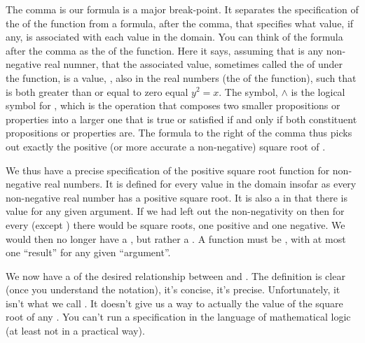 \documentclass[letterpaper,10pt,english]{sphinxmanual}
\begin{document}
The comma is our formula is a major break-point. It separates the
specification of the  of the function from a formula, after
the comma, that specifies what value, if any, is associated with each
value in the domain.  You can think of the formula after the comma as
the  of the function. Here it says, assuming that  is any
non-negative real numner, that the associated value, sometimes called
the  of  under the function, is a value, , also in the
real numbers (the  of the function), such that  is both
greater than or equal to zero equal  \(y^2 = x\). The symbol,
\(\land\) is the logical symbol for , which is the
operation that composes two smaller propositions or properties into a
larger one that is true or satisfied if and only if both constituent
propositions or properties are. The formula to the right of the comma
thus picks out exactly the positive (or more accurate a non-negative)
square root of .

We thus have a precise specification of the positive square root
function for non-negative real numbers. It is defined for every value
in the domain insofar as every non-negative real number has a positive
square root. It is also a  in that there is 
value for any given argument. If we had left out the non-negativity
 on  then for every  (except ) there would be
 square roots, one positive and one negative. We would then no
longer have a , but rather a . A function must be
, with at most one “result” for any given “argument”.

We now have a  of the desired relationship
between  and . The definition is clear (once you understand the
notation), it’s concise, it’s precise. Unfortunately, it isn’t what we
call . It doesn’t give us a way to actually  the
value of the square root of any . You can’t run a specification in
the language of mathematical logic (at least not in a practical way).
\end{document}
